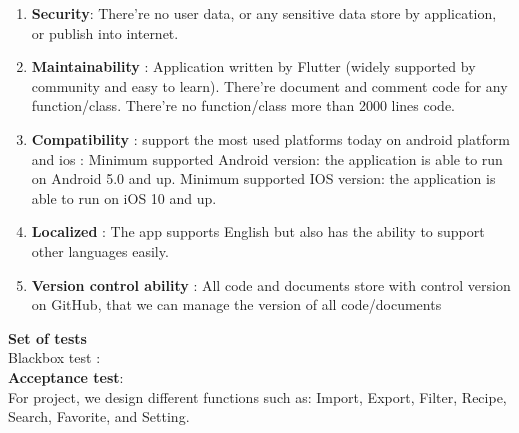 \documentclass{article}
\begin{document}
\begin{enumerate}
        \item \textbf{Security}: There’re no user data, or any sensitive data store by application, or publish into internet. 
        \item \textbf{Maintainability} : Application written by Flutter (widely supported by community and easy to learn). There’re document and comment code for any function/class. There’re no function/class more than 2000 lines code. 
        \item \textbf{Compatibility} : support the most used platforms today on android platform and ios :  Minimum supported Android version: the application is able to run on Android 5.0 and up.  Minimum supported IOS version: the application is able to run on iOS 10 and up. 
        \item \textbf{Localized} : The app supports English but also has the ability to support other languages easily. 
        \item \textbf{Version control ability} : All code and documents store with control version on GitHub, that we can manage the version of all code/documents 
    \end{enumerate}

\textbf{Set of tests} \\

    Blackbox test :   \\
    \textbf{Acceptance test}: \\
        For project, we design different functions such as: Import, Export, Filter, Recipe, Search, Favorite, and Setting. \\
\end{document}
